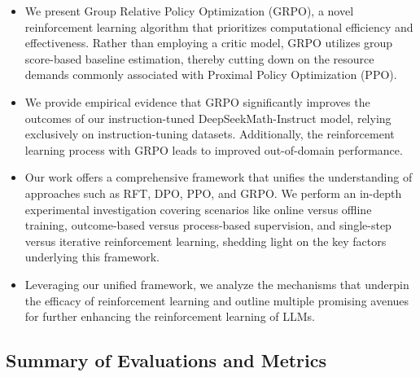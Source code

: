 \begin{itemize}[topsep=0pt]
    \item We present Group Relative Policy Optimization (GRPO), a novel reinforcement learning algorithm that prioritizes computational efficiency and effectiveness. Rather than employing a critic model, GRPO utilizes group score-based baseline estimation, thereby cutting down on the resource demands commonly associated with Proximal Policy Optimization (PPO).
    \item We provide empirical evidence that GRPO significantly improves the outcomes of our instruction-tuned DeepSeekMath-Instruct model, relying exclusively on instruction-tuning datasets. Additionally, the reinforcement learning process with GRPO leads to improved out-of-domain performance.
    \item Our work offers a comprehensive framework that unifies the understanding of approaches such as RFT, DPO, PPO, and GRPO. We perform an in-depth experimental investigation covering scenarios like online versus offline training, outcome-based versus process-based supervision, and single-step versus iterative reinforcement learning, shedding light on the key factors underlying this framework.
    \item Leveraging our unified framework, we analyze the mechanisms that underpin the efficacy of reinforcement learning and outline multiple promising avenues for further enhancing the reinforcement learning of LLMs.
\end{itemize}

\subsection{Summary of Evaluations and Metrics}

